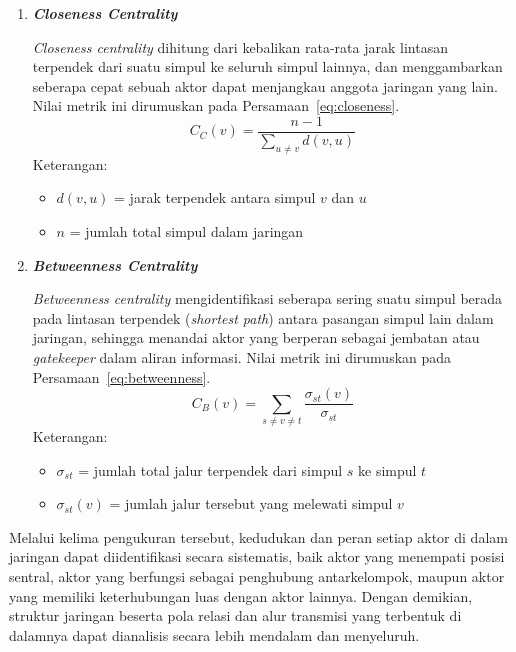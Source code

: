 \begin{enumerate}
	\item \textbf{\textit{Closeness Centrality}}

	\textit{Closeness centrality} dihitung dari kebalikan rata-rata jarak lintasan terpendek dari suatu simpul ke seluruh simpul lainnya, dan menggambarkan seberapa cepat sebuah aktor dapat menjangkau anggota jaringan yang lain. Nilai metrik ini dirumuskan pada Persamaan~\eqref{eq:closeness}.
	\begin{equation}
	C_C(v) = \frac{n-1}{\displaystyle\sum_{u \neq v} d(v,u)}
	\label{eq:closeness}
	\end{equation}
	Keterangan:
	\begin{itemize}[leftmargin=2em,label=$\cdot$]
		\item $d(v,u)$ = jarak terpendek antara simpul $v$ dan $u$
		\item $n$ = jumlah total simpul dalam jaringan
	\end{itemize}

	\item \textbf{\textit{Betweenness Centrality}}

	\textit{Betweenness centrality} mengidentifikasi seberapa sering suatu simpul berada pada lintasan terpendek (\textit{shortest path}) antara pasangan simpul lain dalam jaringan, sehingga menandai aktor yang berperan sebagai jembatan atau \textit{gatekeeper} dalam aliran informasi. Nilai metrik ini dirumuskan pada Persamaan~\eqref{eq:betweenness}.
	\begin{equation}
	C_B(v) = \sum_{s \neq v \neq t} \frac{\sigma_{st}(v)}{\sigma_{st}}
	\label{eq:betweenness}
	\end{equation}
	Keterangan:
	\begin{itemize}[leftmargin=2em,label=$\cdot$]
		\item $\sigma_{st}$ = jumlah total jalur terpendek dari simpul $s$ ke simpul $t$
		\item $\sigma_{st}(v)$ = jumlah jalur tersebut yang melewati simpul $v$
	\end{itemize}

\end{enumerate}

Melalui kelima pengukuran tersebut, kedudukan dan peran setiap aktor di dalam jaringan dapat diidentifikasi secara sistematis, baik aktor yang menempati posisi sentral, aktor yang berfungsi sebagai penghubung antarkelompok, maupun aktor yang memiliki keterhubungan luas dengan aktor lainnya. Dengan demikian, struktur jaringan beserta pola relasi dan alur transmisi yang terbentuk di dalamnya dapat dianalisis secara lebih mendalam dan menyeluruh.

